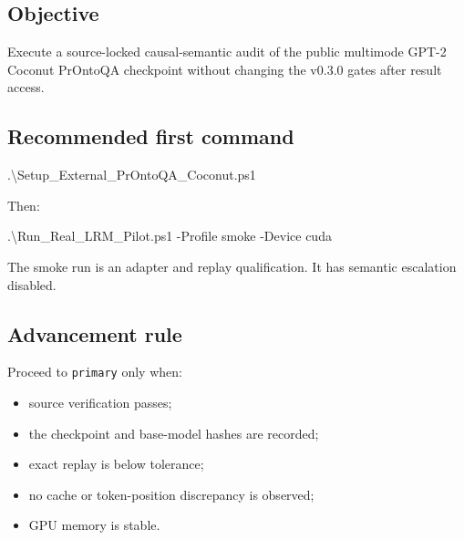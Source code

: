 \documentclass[
  10pt,
]{article}
\newenvironment{Shaded}{}{}
\newcommand{\FunctionTok}[1]{\textcolor[rgb]{0.02,0.16,0.49}{#1}}
\newcommand{\NormalTok}[1]{#1}
\newcommand{\OperatorTok}[1]{\textcolor[rgb]{0.40,0.40,0.40}{#1}}
\providecommand{\tightlist}{%
  \setlength{\itemsep}{0pt}\setlength{\parskip}{0pt}}
\begin{document}
\subsection{Objective}\label{objective}

Execute a source-locked causal-semantic audit of the public multimode
GPT-2 Coconut PrOntoQA checkpoint without changing the v0.3.0 gates
after result access.

\subsection{Recommended first command}\label{recommended-first-command}

\begin{Shaded}
\begin{Highlighting}[]
\OperatorTok{.}\NormalTok{\textbackslash{}Setup\_External\_PrOntoQA\_Coconut}\OperatorTok{.}\FunctionTok{ps1}
\end{Highlighting}
\end{Shaded}

Then:

\begin{Shaded}
\begin{Highlighting}[]
\OperatorTok{.}\NormalTok{\textbackslash{}Run\_Real\_LRM\_Pilot}\OperatorTok{.}\FunctionTok{ps1} \OperatorTok{{-}}\NormalTok{Profile smoke }\OperatorTok{{-}}\NormalTok{Device cuda}
\end{Highlighting}
\end{Shaded}

The smoke run is an adapter and replay qualification. It has semantic
escalation disabled.

\subsection{Advancement rule}\label{advancement-rule}

Proceed to \texttt{primary} only when:

\begin{itemize}
\tightlist
\item
  source verification passes;
\item
  the checkpoint and base-model hashes are recorded;
\item
  exact replay is below tolerance;
\item
  no cache or token-position discrepancy is observed;
\item
  GPU memory is stable.
\end{itemize}
\end{document}
